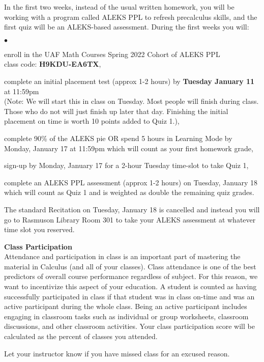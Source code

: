 \documentclass[12pt]{article}
\renewcommand{\emph}[1]{\textsf{\textbf{#1}}}
\newcommand{\localhead}[1]{\par\smallskip\textbf{#1}\nobreak\\}%
\def\heading#1{\localhead{\large\emph{#1}}}
\newenvironment{clist}%
{\bgroup\parskip 0pt\begin{list}{$\bullet$}{\partopsep 4pt\topsep 0pt\itemsep -2pt}}%
{\end{list}\egroup}%
\begin{document}
In the first two weeks, instead of the usual written homework, you will be
working with a program called ALEKS PPL to refresh precalculus skills, and the first
quiz will be an ALEKS-based assessment.  During the first weeks you will:
\begin{clist}
\item enroll in the UAF Math Courses Spring 2022 Cohort of ALEKS PPL\\
class code: \textbf{H9KDU-EA6TX},
\item complete an initial placement test (approx 1-2 hours) by \textbf{Tuesday January 11} at 11:59pm \\
(Note: We will start this in class on Tuesday. Most people will finish during class. Those who do not will just finish up later that day. Finishing the initial placement on time is worth 10 points added to Quiz 1.),
\item complete 90\% of the ALEKS pie \: OR \: spend 5 hours in Learning Mode by Monday, January 17 at 11:59pm which will count as your first homework grade,
\item sign-up by Monday, January 17 for a 2-hour Tuesday time-slot to take Quiz 1, 
\item complete an ALEKS PPL assessment (approx 1-2 hours) on Tuesday, January 18 which will count as Quiz 1 and is weighted as double the remaining quiz grades.
\end{clist}
The standard Recitation on Tuesday, January 18 is cancelled and instead you will go to Rasmuson Library Room 301 to take your ALEKS assessment at whatever time slot you reserved. 

\heading{Class Participation}
Attendance and participation in class is an important part of mastering the material in Calculus (and all of your classes). Class attendance is one of the best predictors of overall course performance regardless of subject. For this reason, we want to incentivize this aspect of your education. A student is counted as having successfully participated in class if that student was in class on-time and was an active participant during the whole class. Being an active participant includes engaging in classroom tasks such as individual or group worksheets, classroom discussions, and other classroom activities. Your class participation score will be calculated as the percent of classes you attended. 

Let your instructor know if you have missed class for an excused reason.
\end{document}
